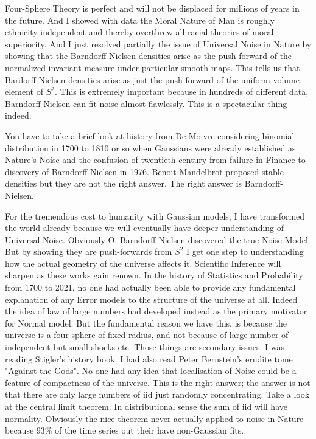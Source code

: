 \documentclass{amsart}
\author{Zulfikar Moinuddin Ahmed}
\date{\today}
\begin{document}
\maketitle

Four-Sphere Theory is perfect and will not be displaced for millions of years in the future.  And I showed with data the Moral Nature of Man is roughly ethnicity-independent and thereby overthrew all racial theories of moral superiority.  And I just resolved partially the issue of Universal Noise in Nature by showing that the Barndorff-Nielsen densities arise as the push-forward of the normalized invariant measure under particular smooth maps.  This tells us that Bardorff-Nielsen densities arise as just the push-forward of the uniform volume element of $S^2$.  This is extremely important because in hundreds of different data, Barndorff-Nielsen can fit noise almost flawlessly.  This is a spectacular thing indeed. 

You have to take a brief look at history from De Moivre considering binomial distribution in 1700 to 1810 or so when Gaussians were already established as Nature's Noise and the confusion of twentieth century from failure in Finance to discovery of Barndorff-Nielsen in 1976.  Benoit Mandelbrot proposed stable densities but they are not the right answer.  The right answer is Barndorff-Nielsen.

For the tremendous cost to humanity with Gaussian models, I have transformed the world already because we will eventually have deeper understanding of Universal Noise.  Obviously O. Barndorff Nielsen discovered the true Noise Model.  But by showing they are push-forwards from $S^2$ I get one step to understanding how the actual geometry of the universe affects it.  Scientific Inference will sharpen as these works gain renown.  In the history of Statistics and Probability from 1700 to 2021, no one had actually been able to provide any fundamental explanation of any Error models to the structure of the universe at all.  Indeed the idea of law of large numbers had developed instead as the primary motivator for Normal model.  But the fundamental reason we have this, is because the universe is a four-sphere of fixed radius, and not because of large number of independent but small shocks etc.  Those things are secondary issues. I was reading Stigler's history book.  I had also read Peter Bernstein's erudite tome "Against the Gods".  No one had any idea that localisation of Noise could be a feature of compactness of the universe.  This is the right answer; the answer is not that there are only large numbers of iid just randomly concentrating.  Take a look at the central limit theorem.  In distributional sense the sum of iid will have normality.  Obviously the nice theorem never actually applied to noise in Nature because 93\% of the time series out their have non-Gaussian fits.
\end{document}
